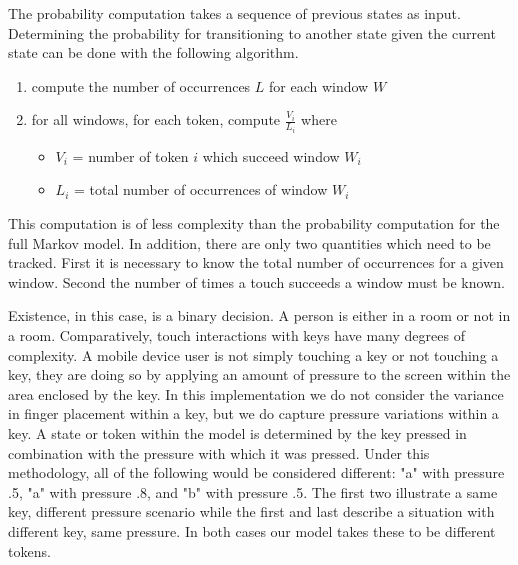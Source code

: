 The probability computation takes a sequence of 
previous states as input.
Determining the probability for transitioning to
another state given the current state can be done
with the following algorithm.
\begin{enumerate}
\item compute the number of occurrences $L$ for each window $W$
\item for all windows, for each token, compute $\frac{V_i}{L_i}$ where
  \begin{itemize} 
  \item $V_i$ = number of token $i$ which succeed window $W_i$
  \item $L_i$ = total number of occurrences of window $W_i$
  \end{itemize}
\end{enumerate}
This computation is of less complexity than 
the probability computation for the full Markov model.
In addition,
there are only two quantities which need to be tracked.
First it is necessary to know the total number of occurrences
for a given window.
Second the number of times a touch succeeds a window must be known. 

%
Existence, in this case, is a binary decision.
A person is either in a room or not in a room.
Comparatively, touch interactions with keys have
many degrees of complexity.
A mobile device user is not simply
touching a key or not touching a key,
they are doing so by applying an amount of pressure to the screen
within the area enclosed by the key.
%
In this implementation we do not consider the variance 
in finger placement within a key,
but we do capture pressure variations within a key. 
%
A state or token within the model is
determined by the key pressed in combination with
the pressure with which it was pressed.
Under this methodology,
all of the following would be considered different:
"a" with pressure .5,
"a" with pressure .8, and
"b" with pressure .5.
The first two illustrate a same key, different pressure scenario
while the first and last describe
a situation with different key, same pressure.
In both cases our model takes these to be 
different tokens.


